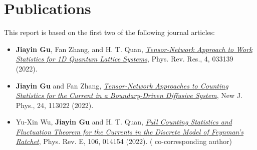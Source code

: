 \chapter{Publications}


This report is based on the first two of the following journal articles:
\begin{itemize}
\item {\bf Jiayin Gu}, Fan Zhang, and H. T. Quan, \href{https://journals.aps.org/prresearch/abstract/10.1103/PhysRevResearch.4.033193}{\it Tensor-Network Approach to Work Statistics for 1D Quantum Lattice Systems}, Phys. Rev. Res., 4, 033139 (2022).
\item {\bf Jiayin Gu} and Fan Zhang, \href{https://iopscience.iop.org/article/10.1088/1367-2630/ac9ed7}{\it Tensor-Network Approaches to Counting Statistics for the Current in a Boundary-Driven Diffusive System}, New J. Phys., 24, 113022 (2022).
\item Yu-Xin Wu, {\bf Jiayin Gu} and H. T. Quan, \href{https://journals.aps.org/pre/abstract/10.1103/PhysRevE.106.014154}{\it Full Counting Statistics and Fluctuation Theorem for the Currents in the Discrete Model of Feynman's Ratchet}, Phys. Rev. E, 106, 014154 (2022). ({\color{blue} co-corresponding author})
\end{itemize}
